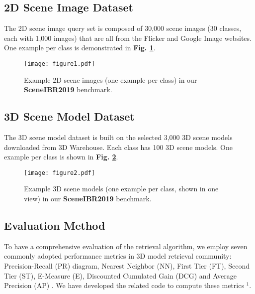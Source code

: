 \documentclass[../main.tex]{subfiles}
\begin{document}
\subsection{2D Scene Image Dataset} The 2D scene image query set is composed of 30,000 scene images (30 classes, each with 1,000 images) that are all from the Flicker and Google Image websites. One example per class is demonstrated in \textbf{Fig. \ref{fig:1}}.

\begin{figure}[!htp]
	\centering
	\texttt{[image: figure1.pdf]}
	\caption{Example 2D scene images (one example per class) in our \textbf{SceneIBR2019} benchmark.}
	\label{fig:1}
\end{figure}

\subsection{3D Scene Model Dataset} The 3D scene model dataset is built on the selected 3,000 3D scene models downloaded from 3D Warehouse. Each class has 100 3D scene models. One example per class is shown in \textbf{Fig. \ref{fig:2}}.

\begin{figure}[!htp]
	\centering
	\texttt{[image: figure2.pdf]}
	\caption{Example 3D scene models (one example per class, shown in one view) in our \textbf{SceneIBR2019} benchmark.}
	\label{fig:2}
\end{figure}

\subsection{Evaluation Method}
\label{sec:Evaluation}
To have a comprehensive evaluation of the retrieval algorithm, we employ 
seven commonly adopted performance metrics in 3D model retrieval 
community: Precision-Recall (PR) diagram, Nearest Neighbor (NN), First 
Tier (FT), Second Tier (ST), E-Measure (E), Discounted Cumulated Gain 
(DCG) and Average Precision (AP) \cite{CIVU}. We have developed the 
related code to compute these metrics $^{1}$.
\end{document}
